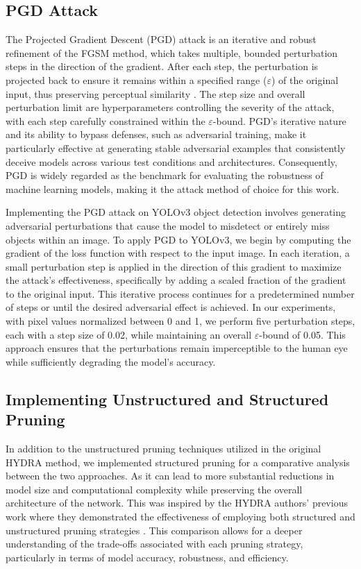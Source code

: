 \documentclass[journal,onecolumn,12pt]{IEEEtran}
\begin{document}
\subsection{PGD Attack}
The Projected Gradient Descent (PGD) attack is an iterative and robust refinement of the FGSM method, which takes multiple, bounded perturbation steps in the direction of the gradient. After each step, the perturbation is projected back to ensure it remains within a specified range ($\varepsilon$) of the original input, thus preserving perceptual similarity \cite{madry2019deeplearningmodelsresistant}. The step size and overall perturbation limit are hyperparameters controlling the severity of the attack, with each step carefully constrained within the $\varepsilon$-bound. PGD’s iterative nature and its ability to bypass defenses, such as adversarial training, make it particularly effective at generating stable adversarial examples that consistently deceive models across various test conditions and architectures. Consequently, PGD is widely regarded as the benchmark for evaluating the robustness of machine learning models, making it the attack method of choice for this work.

Implementing the PGD attack on YOLOv3 object detection involves generating adversarial perturbations that cause the model to misdetect or entirely miss objects within an image. To apply PGD to YOLOv3, we begin by computing the gradient of the loss function with respect to the input image. In each iteration, a small perturbation step is applied in the direction of this gradient to maximize the attack's effectiveness, specifically by adding a scaled fraction of the gradient to the original input. This iterative process continues for a predetermined number of steps or until the desired adversarial effect is achieved. In our experiments, with pixel values normalized between 0 and 1, we perform five perturbation steps, each with a step size of 0.02, while maintaining an overall $\varepsilon$-bound of 0.05. This approach ensures that the perturbations remain imperceptible to the human eye while sufficiently degrading the model's accuracy.

\subsection{Implementing Unstructured and Structured Pruning}
In addition to the unstructured pruning techniques utilized in the original HYDRA method, we implemented structured pruning for a comparative analysis between the two approaches. As it can lead to more substantial reductions in model size and computational complexity while preserving the overall architecture of the network. This was inspired by the HYDRA authors' previous work where they demonstrated the effectiveness of employing both structured and unstructured pruning strategies \cite{beforehydra}. This comparison allows for a deeper understanding of the trade-offs associated with each pruning strategy, particularly in terms of model accuracy, robustness, and efficiency.
\end{document}

